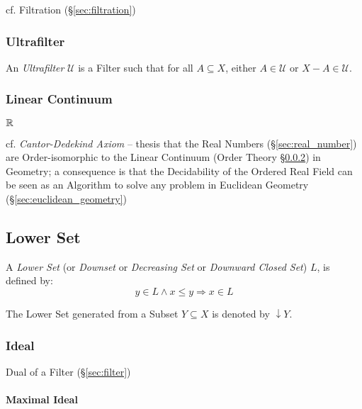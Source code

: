 cf. Filtration (\S\ref{sec:filtration})



\subsubsection{Ultrafilter}\label{sec:ultrafilter}

An \emph{Ultrafilter} $\mathcal{U}$ is a Filter such that for all $A
\subseteq X$, either $A \in \mathcal{U}$ or $X - A \in \mathcal{U}$.



\subsubsection{Linear Continuum}\label{sec:linear_continuum}

$\mathbb{R}$

cf. \emph{Cantor-Dedekind Axiom} -- thesis that the Real Numbers
(\S\ref{sec:real_number}) are Order-isomorphic to the Linear Continuum (Order
Theory \S\ref{sec:linear_continuum}) in Geometry; a consequence is that the
Decidability of the Ordered Real Field can be seen as an Algorithm to solve any
problem in Euclidean Geometry (\S\ref{sec:euclidean_geometry})



\subsection{Lower Set}\label{sec:lower_set}

A \emph{Lower Set} (or \emph{Downset} or \emph{Decreasing Set} or
\emph{Downward Closed Set}) $L$, is defined by:
\[
  y \in L \wedge x \leq y \Rightarrow x \in L
\]

The Lower Set generated from a Subset $Y \subseteq X$ is denoted by
$\downarrow Y$.



\subsubsection{Ideal}\label{sec:order_ideal}

Dual of a Filter (\S\ref{sec:filter})



\paragraph{Maximal Ideal}\label{sec:maximal_ideal}\hfill

